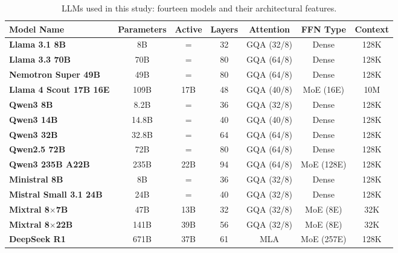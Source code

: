 \begin{table}[h!]
\centering
\footnotesize
\caption{LLMs used in this study: fourteen models and their architectural features.}
\label{tab:models}

\begin{tabularx}{\textwidth}{l c c c c c c}
\toprule
\textbf{Model Name} & \textbf{Parameters} & \textbf{Active} & 
\textbf{Layers} & \textbf{Attention} & \textbf{FFN Type} & \textbf{Context} \\

\midrule

\textbf{Llama 3.1 8B}           & 8B   & =   & 32 & GQA (32/8) & Dense        & 128K \\
\textbf{Llama 3.3 70B}          & 70B  & =   & 80 & GQA (64/8) & Dense        & 128K \\
\textbf{Nemotron Super 49B}     & 49B  & =   & 80 & GQA (64/8) & Dense        & 128K \\
\textbf{Llama 4 Scout 17B 16E}  & 109B & 17B  & 48 & GQA (40/8) & MoE (16E)    & 10M \\

\midrule

\textbf{Qwen3 8B}               & 8.2B & =   & 36 & GQA (32/8) & Dense        & 128K \\
\textbf{Qwen3 14B}              & 14.8B& =   & 40 & GQA (40/8) & Dense        & 128K \\
\textbf{Qwen3 32B}              & 32.8B& =   & 64 & GQA (64/8) & Dense        & 128K \\
\textbf{Qwen2.5 72B}            & 72B  & =   & 80 & GQA (64/8) & Dense        & 128K \\
\textbf{Qwen3 235B A22B}        & 235B & 22B  & 94 & GQA (64/8) & MoE (128E)   & 128K \\

\midrule

\textbf{Ministral 8B}           & 8B   & =   & 36 & GQA (32/8) & Dense        & 128K \\
\textbf{Mistral Small 3.1 24B}  & 24B  & =   & 40 & GQA (32/8) & Dense        & 128K \\
\textbf{Mixtral 8$\times$7B}    & 47B  & 13B  & 32 & GQA (32/8) & MoE (8E)     & 32K \\
\textbf{Mixtral 8$\times$22B}   & 141B & 39B  & 56 & GQA (32/8) & MoE (8E)     & 32K \\

\midrule

\textbf{DeepSeek R1}            & 671B & 37B  & 61 & MLA        & MoE (257E)   & 128K \\

\bottomrule
\end{tabularx}
\end{table}

